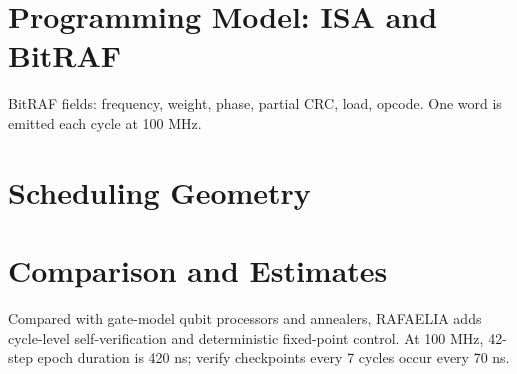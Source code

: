 \documentclass[11pt]{article}
\begin{document}
\begin{center}
\end{center}

\section{Programming Model: ISA and BitRAF}
BitRAF fields: frequency, weight, phase, partial CRC, load, opcode. One word is emitted each cycle at 100 MHz.

\section{Scheduling Geometry}
\begin{center}
\end{center}

\section{Comparison and Estimates}
Compared with gate-model qubit processors and annealers, RAFAELIA adds cycle-level self-verification and deterministic fixed-point control.
At 100 MHz, 42-step epoch duration is 420 ns; verify checkpoints every 7 cycles occur every 70 ns.
\end{document}
